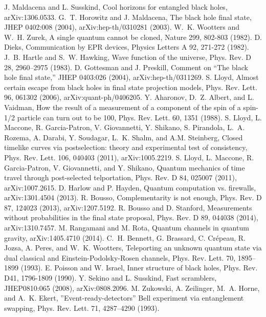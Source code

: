 \documentclass[11pt]{article}
\begin{document}
\begin{thebibliography}{99}
 J. Maldacena and L. Susskind, Cool horizons for entangled black holes, arXiv:1306.0533.
 G.~T. Horowitz and J. Maldacena, The black hole final state, JHEP 0402:008 (2004), arXiv:hep-th/0310281 (2003).
 W.~K. Wootters and W.~H. Zurek, A single quantum cannot be cloned, Nature 299, 802-803 (1982).
 D. Dieks, Communication by EPR devices, Physics Letters A 92, 271-272 (1982).
 J.~B. Hartle and S.~W. Hawking, Wave function of the universe, Phys. Rev. D 28, 2960--2975 (1983).
 D. Gottesman and J. Preskill, Comment on ``The black hole final state,'' JHEP 0403:026 (2004), arXiv:hep-th/0311269.
 S. Lloyd, Almost certain escape from black holes in final state projection models, Phys. Rev. Lett. 96, 061302 (2006), arXiv:quant-ph/0406205.
 Y. Aharonov, D.~Z. Albert, and L. Vaidman, How the result of a measurement of a component of the spin of a spin-1/2 particle can turn out to be 100, Phys. Rev. Lett. 60, 1351 (1988).
 S. Lloyd, L. Maccone, R. Garcia-Patron, V. Giovannetti, Y. Shikano, S. Pirandola, L.~A. Rozema, A. Darabi, Y. Soudagar, L.~K. Shalm, and A.M. Steinberg, Closed timelike curves via postselection: theory and experimental test of consistency, Phys. Rev. Lett. 106, 040403 (2011), arXiv:1005.2219.
 S. Lloyd, L. Maccone, R. Garcia-Patron, V. Giovannetti, and Y. Shikano, Quantum mechanics of time travel through post-selected telportation, Phys. Rev. D 84, 025007 (2011), arXiv:1007.2615.
 D. Harlow and P. Hayden, Quantum computation vs. firewalls, arXiv:1301.4504 (2013).
 R. Bousso, Complementarity is not enough, Phys. Rev. D 87, 124023 (2013), arXiv:1207.5192.
 R. Bousso and D. Stanford, Measurements without probabilities in the final state proposal, Phys. Rev. D 89, 044038 (2014), arXiv:1310.7457.
 M. Rangamani and M. Rota, Quantum channels in quantum gravity, arXiv:1405.4710 (2014).
 C.~H. Bennett, G. Brassard, C. Cr\'epeau, R. Jozsa, A. Peres, and W.~K. Wootters, Teleporting an unknown quantum state via dual classical and Einstein-Podolsky-Rosen channels, Phys. Rev. Lett. 70, 1895--1899 (1993).
 E. Poisson and W. Israel, Inner structure of black holes, Phys. Rev. D41, 1796-1809 (1990).
 Y. Sekino and L. Susskind, Fast scramblers, JHEP0810:065 (2008), arXiv:0808.2096.
 M. Zukowski, A. Zeilinger, M.~A. Horne, and A.~K. Ekert, ''Event-ready-detectors'' Bell experiment via entanglement swapping, Phys. Rev. Lett. 71, 4287--4290 (1993).

\end{thebibliography}
\end{document}
